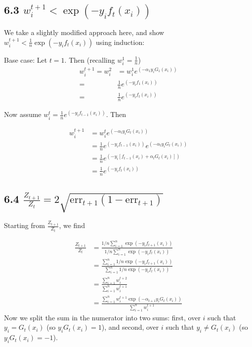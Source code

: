 \documentclass[paper=a4, fontsize=11pt]{scrartcl} %
\numberwithin{equation}{section} %
\numberwithin{figure}{section} %
\numberwithin{table}{section} %
\begin{document}
\subsection*{6.3 $w_i^{t+1} < \exp(-y_i f_t(x_i))$}

We take a slightly modified approach here, and show $w_i^{t+1} < \frac{1}{n} \exp(-y_i f_t(x_i))$ using induction:

Base case: Let  $t = 1$. Then (recalling $w_i^1 = \frac{1}{n}$)
\begin{align*}
w_i^{t+1} = w_i^2 &= w_i^1 e^{(-\alpha_1 y_i G_1(x_i))} \\
=& \frac{1}{n} e^{(-y_i f_1(x_i))} \\
=& \frac{1}{n} e^{(-y_i f_t(x_i))}
\end{align*}

Now assume $w_i^t = \frac{1}{n} e^{(-y_i f_{t-1}(x_i))}$. Then

\begin{align*}
w_i^{t+1} &= w_i^t e^{(-\alpha_t y_i G_t(x_i))} \\
&= \frac{1}{n} e^{(-y_i f_{t-1}(x_i))} e^{(-\alpha_t y_i G_t(x_i))} \\
&= \frac{1}{n} e^{(-y_i [ f_{t-1}(x_i)+\alpha_t G_t(x_i)])} \\
&= \frac{1}{n} e^{(-y_i f_{t}(x_i))}
\end{align*}

\subsection*{6.4 $\frac{Z_{t+1}}{Z_t} = 2 \sqrt{\mathrm{err}_{t+1}(1 - \mathrm{err}_{t+1})}$}

Starting from $\frac{Z_{t+1}}{Z_t}$, we find

\begin{align*}
\frac{Z_{t+1}}{Z_t} &= \frac{1/n \sum_{i =1}^n \exp(-y_i f_{t+1}(x_i))}{1/n \sum_{i =1}^n \exp(-y_i f_{t}(x_i))} \\
&= \frac{\sum_{i =1}^n 1/n \exp(-y_i f_{t+1}(x_i))}{ \sum_{i =1}^n 1/n \exp(-y_i f_{t}(x_i))} \\
&= \frac{\sum_{i =1}^n w_i^{t+2}}{ \sum_{i =1}^n w_i^{t+1}} \\
&= \frac{\sum_{i =1}^n w_i^{t+1}\exp(-\alpha_{t+1}y_iG_t(x_i))}{ \sum_{i =1}^n w_i^{t+1}}
\end{align*}
Now we split the sum in the numerator into two sums: first, over $i$ such that $y_i = G_t(x_i)$ (so $y_i G_t(x_i) = 1$), and second, over $i$ such that $y_i \ne G_t(x_i)$ (so $y_i G_t(x_i) = -1$). 
\end{document}
